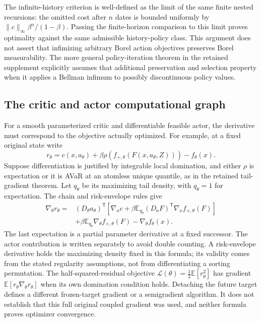 The infinite-history criterion is well-defined as the limit of the
same finite nested recursions: the omitted cost after $n$ dates is
bounded uniformly by $\|c\|_\infty\beta^n/(1-\beta)$.
Passing the finite-horizon comparison to this limit proves optimality
against the same admissible history-policy class.  This argument does
not assert that infimizing arbitrary Borel action objectives preserves
Borel measurability.  The more general policy-iteration theorem in
the retained supplement explicitly assumes that additional preservation
and selection property when it applies a Bellman infimum to possibly
discontinuous policy values.

\subsection{The critic and actor computational graph}
For a smooth parameterized critic and differentiable feasible actor,
the derivative must correspond to the objective actually optimized.
For example, at a fixed original state write
\[
 r_\theta=c(x,a_\theta)+
     \beta\rho(f_{+,\theta}(F(x,a_\theta,Z)))-f_\theta(x).
\]
Suppose differentiation is justified by integrable local domination,
and either $\rho$ is expectation or it is AVaR at an atomless unique
quantile, as in the retained tail-gradient theorem.  Let $q_\theta$
be its maximizing tail density, with $q_\theta=1$ for expectation.
The chain and risk-envelope rules give
\begin{align*}
 \nabla_\theta r_\theta={}&
 (D_\theta a_\theta)^{\mathsf T}
 \left[\nabla_ac+
  \beta\mathbb E_{q_\theta}
          (D_aF)^{\mathsf T}\nabla_xf_{+,\theta}(F)\right]\\
 &+\beta\mathbb E_{q_\theta}\nabla_\theta f_{+,\theta}(F)
       -\nabla_\theta f_\theta(x).
\end{align*}
The last expectation is a partial parameter derivative at a fixed
successor.  The actor contribution is written separately to avoid
double counting.  A risk-envelope derivative holds the maximizing
density fixed in this formula; its validity comes from the stated
regularity assumptions, not from differentiating a sorting permutation.
The half-squared-residual objective
$\mathcal L(\theta)=\tfrac12\mathbb E[r_\theta^2]$ has gradient
$\mathbb E[r_\theta\nabla_\theta r_\theta]$ when its own
domination condition holds.  Detaching the future target defines a
different frozen-target gradient or a semigradient algorithm.  It
does not establish that this full original coupled gradient was used,
and neither formula proves optimizer convergence.

